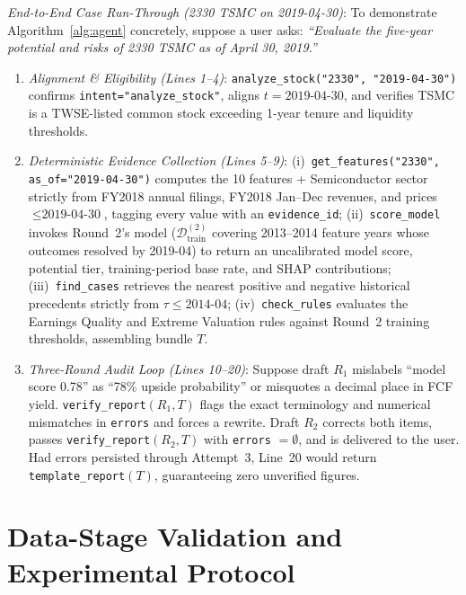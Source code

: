 \documentclass[conference]{IEEEtran}
\begin{document}
\emph{End-to-End Case Run-Through (2330 TSMC on 2019-04-30)}: To demonstrate Algorithm~\ref{alg:agent} concretely, suppose a user asks: \emph{``Evaluate the five-year potential and risks of 2330 TSMC as of April 30, 2019.''}
\begin{enumerate}
    \item \emph{Alignment \& Eligibility (Lines 1--4)}: \texttt{analyze\_stock("2330", "2019-04-30")} confirms \texttt{intent="analyze\_stock"}, aligns $t=\text{2019-04-30}$, and verifies TSMC is a TWSE-listed common stock exceeding 1-year tenure and liquidity thresholds.
    \item \emph{Deterministic Evidence Collection (Lines 5--9)}:
    (i)~\texttt{get\_features("2330", as\_of="2019-04-30")} computes the 10 features + Semiconductor sector strictly from FY2018 annual filings, FY2018 Jan--Dec revenues, and prices $\le \text{2019-04-30}$, tagging every value with an \texttt{evidence\_id};
    (ii)~\texttt{score\_model} invokes Round~2's model ($\mathcal{D}_{\text{train}}^{(2)}$ covering 2013--2014 feature years whose outcomes resolved by 2019-04) to return an uncalibrated model score, potential tier, training-period base rate, and SHAP contributions;
    (iii)~\texttt{find\_cases} retrieves the nearest positive and negative historical precedents strictly from $\tau \le \text{2014-04}$;
    (iv)~\texttt{check\_rules} evaluates the Earnings Quality and Extreme Valuation rules against Round~2 training thresholds, assembling bundle $T$.
    \item \emph{Three-Round Audit Loop (Lines 10--20)}: Suppose draft $R_1$ mislabels ``model score 0.78'' as ``78\% upside probability'' or misquotes a decimal place in FCF yield. \texttt{verify\_report}$(R_1, T)$ flags the exact terminology and numerical mismatches in \texttt{errors} and forces a rewrite. Draft $R_2$ corrects both items, passes \texttt{verify\_report}$(R_2, T)$ with \texttt{errors} $= \emptyset$, and is delivered to the user. Had errors persisted through Attempt~3, Line~20 would return \texttt{template\_report}$(T)$, guaranteeing zero unverified figures.
\end{enumerate}

\section{Data-Stage Validation and Experimental Protocol}
\end{document}
